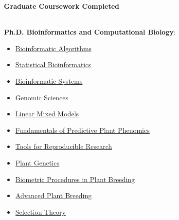 \vspace{0.4cm}
{\Large \textbf{Graduate Coursework Completed}}\\[-0.4cm]
\makebox[\linewidth]{\rule{1.0\textwidth}{0.4pt}}\\
\vspace{0cm}

\textbf{Ph.D. Bioinformatics and Computational Biology}:
\vspace{-.7cm}
\begin{multicols}{3}
\begin{itemize}[left=0.2cm, itemsep=-0.15cm]
    \item \href{http://catalog.iastate.edu/search/?P=BCB\%20567}{{\color{black}Bioinformatic Algorithms}}
    \item \href{http://catalog.iastate.edu/search/?P=BCB\%20568}{{\color{black}Statistical Bioinformatics}}
    \item \href{http://catalog.iastate.edu/search/?P=BCB\%20570}{{\color{black}Bioinformatic Systems}}
    \item \href{http://guide.wisc.edu/search/?P=GENETICS\%20626}{{\color{black}Genomic Sciences}}
    \item \href{http://guide.wisc.edu/search/?P=DY\%20SCI\%20875}{{\color{black}Linear Mixed Models}}
    \item \href{https://www.predictivephenomicsinplants.iastate.edu/core-courses}{{\color{black}Fundamentals of Predictive Plant Phenomics}}
    \item \href{http://kbroman.org/Tools4RR/}{{\color{black}Tools for Reproducible Research}}
    \item \href{http://guide.wisc.edu/search/?P=GENETICS\%20631}{{\color{black}Plant Genetics}}
    \item \href{http://guide.wisc.edu/search/?P=AGRONOMY\%20811}{{\color{black}Biometric Procedures in Plant Breeding}}
    \item \href{http://guide.wisc.edu/search/?P=AGRONOMY\%20850}{{\color{black}Advanced Plant Breeding}}
    \item \href{http://guide.wisc.edu/search/?P=AGRONOMY\%20812}{{\color{black}Selection Theory}}
\end{itemize}
\end{multicols}
\vspace{-.4cm}


